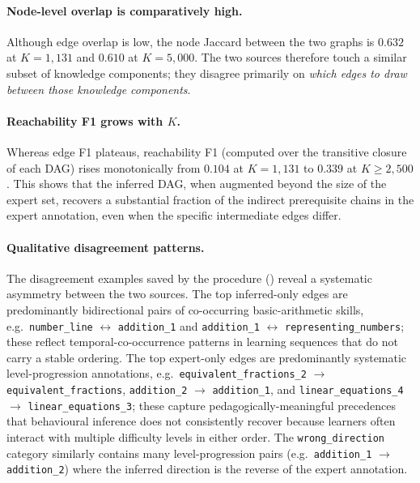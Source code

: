 \documentclass[pdflatex,sn-basic]{sn-jnl}
\newcommand{\KCs}{knowledge components}
\begin{document}
\paragraph{Node-level overlap is comparatively high.}
Although edge overlap is low, the node Jaccard between the two graphs
is $0.632$ at $K=1{,}131$ and $0.610$ at $K=5{,}000$. The two sources
therefore touch a similar subset of \KCs{}; they disagree primarily on
\emph{which edges to draw between those \KCs{}}.

\paragraph{Reachability F1 grows with $K$.}
Whereas edge F1 plateaus, reachability F1 (computed over the transitive
closure of each DAG) rises monotonically from $0.104$ at $K=1{,}131$
to $0.339$ at $K \geq 2{,}500$. This shows that the inferred DAG, when
augmented beyond the size of the expert set, recovers a substantial
fraction of the indirect prerequisite chains in the expert annotation,
even when the specific intermediate edges differ.

\paragraph{Qualitative disagreement patterns.}
The disagreement examples saved by the procedure
() reveal a
systematic asymmetry between the two sources.
The top inferred-only edges are predominantly bidirectional pairs of
co-occurring basic-arithmetic skills, e.g.\ \texttt{number\_line}
$\leftrightarrow$ \texttt{addition\_1} and \texttt{addition\_1}
$\leftrightarrow$ \texttt{representing\_numbers}; these reflect
temporal-co-occurrence patterns in learning sequences that do not
carry a stable ordering.
The top expert-only edges are predominantly systematic
level-progression annotations, e.g.\ \texttt{equivalent\_fractions\_2}
$\rightarrow$ \texttt{equivalent\_fractions}, \texttt{addition\_2}
$\rightarrow$ \texttt{addition\_1}, and
\texttt{linear\_equations\_4} $\rightarrow$ \texttt{linear\_equations\_3};
these capture pedagogically-meaningful precedences that behavioural
inference does not consistently recover because learners often interact
with multiple difficulty levels in either order.
The \texttt{wrong\_direction} category similarly contains many
level-progression pairs (e.g.\ \texttt{addition\_1} $\rightarrow$
\texttt{addition\_2}) where the inferred direction is the reverse of
the expert annotation.
\end{document}
